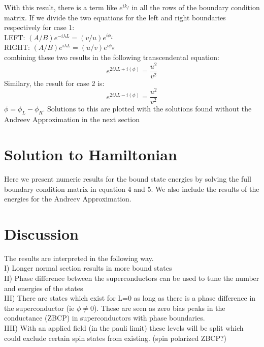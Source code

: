 \documentclass[a4paper,11pt]{article}
\begin{document}
With this result, there is a term like $e^{ik_f}$ in all the rows of the boundary condition matrix. If we divide the two equations for the left and right boundaries respectively for case 1: \\
LEFT: $(A/B)e^{-i\lambda L} = (v/u) e^{i\phi_L}$\\
RIGHT: $(A/B)e^{i\lambda L} = (u/v) e^{i\phi_R}$ \\
combining these two results in the following transcendental equation:
\begin{equation}
e^{2i\lambda L + i(\phi)} = \frac{u^2}{v^2}
\end{equation}
Similary, the result for case 2 is:
\begin{equation}
e^{2i\lambda L - i(\phi)} = \frac{u^2}{v^2}
\end{equation}
$\phi=\phi_L-\phi_R$. Solutions to this are plotted with the solutions found without the Andreev Approximation in the next section
\section*{Solution to Hamiltonian}
Here we present numeric results for the bound state energies by solving the full boundary condition matrix in equation 4 and 5. We also include the results of the energies for the Andreev Approximation.

\section*{Discussion}
The results are interpreted in the following way. \\
I) Longer normal section results in more bound states\\
II) Phase difference between the superconductors can be used to tune the number and energies of the states \\
III) There are states which exist for L=0 as long as there is a phase difference in the superconductor (ie $\phi\ne 0$). These are seen as zero bias peaks in the conductance (ZBCP) in superconductors with phase boundaries. \\
IIII) With an applied field (in the pauli limit) these levels will be split which could exclude certain spin states from existing. (spin polarized ZBCP?)
\end{document}

